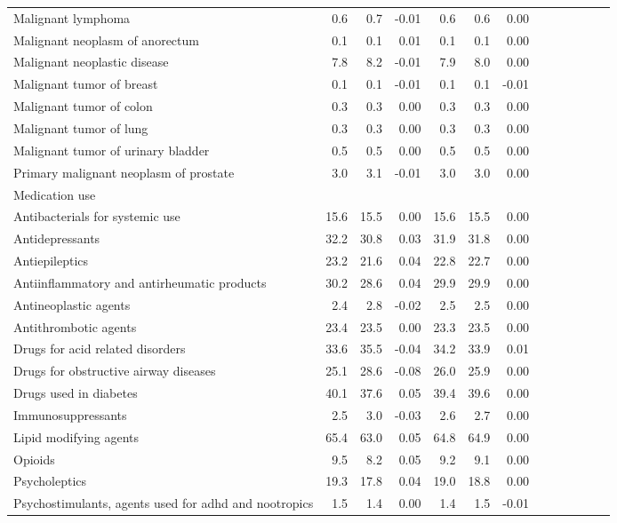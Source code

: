 \documentclass[11pt,]{article}
\begin{document}
\begin{longtable}{lrrrrrrrrrrrr}
      Malignant lymphoma &  0.6 &  0.7 & -0.01 &  0.6 &  0.6 &  0.00 \\ 
      Malignant neoplasm of anorectum &  0.1 &  0.1 &  0.01 &  0.1 &  0.1 &  0.00 \\ 
      Malignant neoplastic disease &  7.8 &  8.2 & -0.01 &  7.9 &  8.0 &  0.00 \\ 
      Malignant tumor of breast &  0.1 &  0.1 & -0.01 &  0.1 &  0.1 & -0.01 \\ 
      Malignant tumor of colon &  0.3 &  0.3 &  0.00 &  0.3 &  0.3 &  0.00 \\ 
      Malignant tumor of lung &  0.3 &  0.3 &  0.00 &  0.3 &  0.3 &  0.00 \\ 
      Malignant tumor of urinary bladder &  0.5 &  0.5 &  0.00 &  0.5 &  0.5 &  0.00 \\ 
      Primary malignant neoplasm of prostate &  3.0 &  3.1 & -0.01 &  3.0 &  3.0 &  0.00 \\ 
  Medication use &    &    &     &    &    &     \\ 
      Antibacterials for systemic use & 15.6 & 15.5 &  0.00 & 15.6 & 15.5 &  0.00 \\ 
      Antidepressants & 32.2 & 30.8 &  0.03 & 31.9 & 31.8 &  0.00 \\ 
      Antiepileptics & 23.2 & 21.6 &  0.04 & 22.8 & 22.7 &  0.00 \\ 
      Antiinflammatory and antirheumatic products & 30.2 & 28.6 &  0.04 & 29.9 & 29.9 &  0.00 \\ 
      Antineoplastic agents &  2.4 &  2.8 & -0.02 &  2.5 &  2.5 &  0.00 \\ 
      Antithrombotic agents & 23.4 & 23.5 &  0.00 & 23.3 & 23.5 &  0.00 \\ 
      Drugs for acid related disorders & 33.6 & 35.5 & -0.04 & 34.2 & 33.9 &  0.01 \\ 
      Drugs for obstructive airway diseases & 25.1 & 28.6 & -0.08 & 26.0 & 25.9 &  0.00 \\ 
      Drugs used in diabetes & 40.1 & 37.6 &  0.05 & 39.4 & 39.6 &  0.00 \\ 
      Immunosuppressants &  2.5 &  3.0 & -0.03 &  2.6 &  2.7 &  0.00 \\ 
      Lipid modifying agents & 65.4 & 63.0 &  0.05 & 64.8 & 64.9 &  0.00 \\ 
      Opioids &  9.5 &  8.2 &  0.05 &  9.2 &  9.1 &  0.00 \\ 
      Psycholeptics & 19.3 & 17.8 &  0.04 & 19.0 & 18.8 &  0.00 \\ 
      Psychostimulants, agents used for adhd and nootropics &  1.5 &  1.4 &  0.00 &  1.4 &  1.5 & -0.01 \\ 
   \bottomrule\end{longtable}
\end{document}
